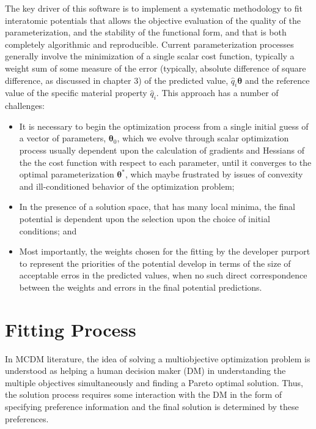 The key driver of this software is to implement a systematic methodology to fit interatomic potentials that allows the objective evaluation of the quality of the parameterization, and the stability of the functional form, and that is both completely algorithmic and reproducible.  Current parameterization processes generally involve the minimization of a single scalar cost function, typically a weight sum of some measure of the error (typically, absolute difference of square difference, as discussed in chapter 3) of the predicted value, $\hat{q}_i{\bm{\theta}}$ and the reference value of the specific material property $\hat{q}_i$.  This approach has a number of challenges:
\begin{itemize}
	\item It is necessary to begin the optimization process from a single initial guess of a vector of parameters, $\bm{\theta}_0$, which we evolve through scalar optimization process usually dependent upon the calculation of gradients and Hessians of the the cost function with respect to each parameter, until it converges to the optimal parameterization $\bm{\theta}^*$, which maybe frustrated by issues of convexity and ill-conditioned behavior of the optimization problem;
	\item In the presence of a solution space, that has many local minima, the final potential is dependent upon the selection upon the choice of initial conditions; and
	\item Most importantly, the weights chosen for the fitting by the developer purport to represent the priorities of the potential develop in terms of the size of acceptable erros in the predicted values, when no such direct correspondence between the weights and errors in the final potential predictions.
\end{itemize}
\section{Fitting Process}
In MCDM literature, the idea of solving a multiobjective optimization problem is understood as helping a human decision maker (DM) in understanding the multiple objectives simultaneously and finding a Pareto optimal solution.  Thus, the solution process requires some interaction with the DM in the form of specifying preference information and the final solution is determined by these preferences.

